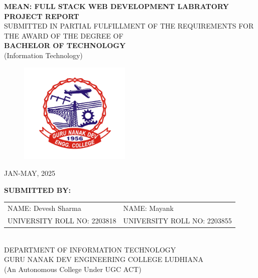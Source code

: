 \documentclass[12pt,a4paper]{article}
\title{}
\date{}
\begin{document}
\centering
\vspace{2cm}
{\large\textbf{
    MEAN: FULL STACK WEB DEVELOPMENT LABRATORY\\
    \vspace{0.5cm}
    PROJECT REPORT\\
}}
\vspace{1cm}
{
\normalsize
SUBMITTED IN PARTIAL FULFILLMENT OF THE REQUIREMENTS FOR THE AWARD OF THE DEGREE OF\\\vspace{0.8cm}
{\large \textbf{BACHELOR OF TECHNOLOGY}\\(Information Technology)}
}

\vspace{1cm}
    \begin{figure}[H]
    \centering
    \includegraphics[width=0.475\textwidth]{assets/GNE_logo.png}
    \end{figure}
    {\large JAN-MAY, 2025}
    \vspace{1cm}

    \textbf{SUBMITTED BY:}\\
    \vspace{1cm}
    \begin{tabular}{p{8cm}p{8cm}}
    NAME: Devesh Sharma & NAME: Mayank\\
    UNIVERSITY ROLL NO: 2203818 & UNIVERSITY ROLL NO: 2203855\\
    \end{tabular}\\
    \vspace{1cm}
    {DEPARTMENT OF INFORMATION TECHNOLOGY}\\
    \vspace{0.2cm}
    {\large GURU NANAK DEV ENGINEERING COLLEGE LUDHIANA}\\
    \vspace{0.2cm}
    (An Autonomous College Under UGC ACT)

\justifying
\newpage
\end{document}
